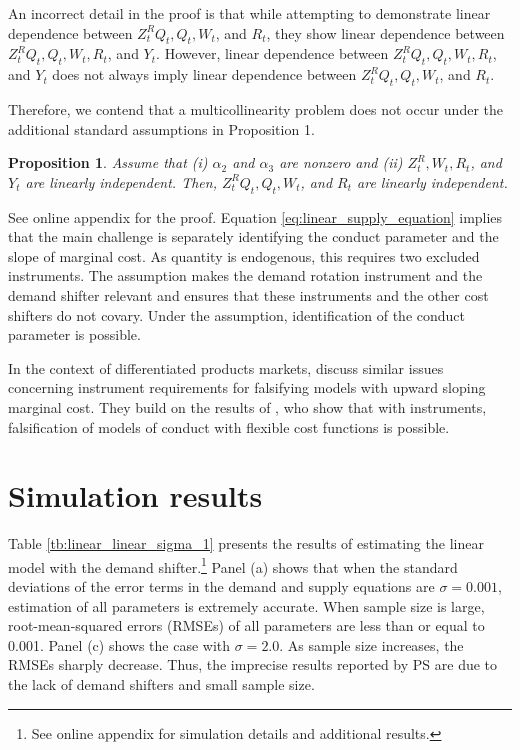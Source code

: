 \documentclass[11pt, a4paper]{article}
\newtheorem{proposition}{Proposition}
\begin{document}
An incorrect detail in the proof is that while attempting to demonstrate linear dependence between $Z^{R}_{t}Q_{t}, Q_{t}, W_{t}$, and $R_{t}$, they show linear dependence between $Z^{R}_{t}Q_{t}, Q_{t}, W_{t}, R_{t}$, and $Y_t$. 
However, linear dependence between $Z^{R}_{t}Q_{t}, Q_{t},W_{t}, R_{t}$, and $Y_t$ does not always imply linear dependence between $Z^{R}_{t}Q_{t}, Q_{t}, W_{t}$, and $R_{t}$.

Therefore, we contend that a multicollinearity problem does not occur under the additional standard assumptions in Proposition 1.
\begin{proposition}
    Assume that (i) $\alpha_2$ and $\alpha_3$ are nonzero and (ii) $Z^R_t, W_t, R_t$, and $Y_t$ are linearly independent.
    Then, $Z^{R}_{t}Q_{t}, Q_{t}, W_{t}$, and $R_{t}$ are linearly independent.
\end{proposition}

See online appendix for the proof.
Equation \eqref{eq:linear_supply_equation} implies that the main challenge is separately identifying the conduct parameter and the slope of marginal cost.
As quantity is endogenous, this requires two excluded instruments. 
The assumption makes the demand rotation instrument and the demand shifter relevant and ensures that these instruments and the other cost shifters do not covary.
Under the assumption, identification of the conduct parameter is possible.

In the context of differentiated products markets, \cite{magnolfi2022falsifying} discuss similar issues concerning instrument requirements for falsifying models with upward sloping marginal cost. 
They build on the results of \cite{berry2014identification}, who show that with instruments, falsification of models of conduct with flexible cost functions is possible.



\section{Simulation results}\label{sec:results}

Table \ref{tb:linear_linear_sigma_1} presents the results of estimating the linear model with the demand shifter.\footnote{See online appendix for simulation details and additional results.}
Panel (a) shows that when the standard deviations of the error terms in the demand and supply equations are $\sigma = 0.001$, estimation of all parameters is extremely accurate.
When sample size is large, root-mean-squared errors (RMSEs) of all parameters are less than or equal to 0.001. 
Panel (c) shows the case with $\sigma = 2.0$. 
As sample size increases, the RMSEs sharply decrease. 
Thus, the imprecise results reported by PS are due to the lack of demand shifters and small sample size.
\end{document}
